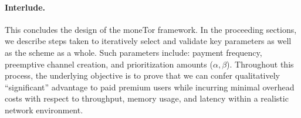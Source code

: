 
\paragraph*{Interlude.} This concludes the design of the moneTor framework. In
the proceeding sections, we describe steps taken to iteratively select and
validate key parameters as well as the scheme as a whole. Such parameters
include: payment frequency, preemptive channel creation, and prioritization
amounts ($\alpha, \beta$). Throughout this process, the underlying objective is
to prove that we can confer qualitatively ``significant'' advantage to paid
premium users while incurring minimal overhead costs with respect to throughput,
memory usage, and latency within a realistic network environment.


